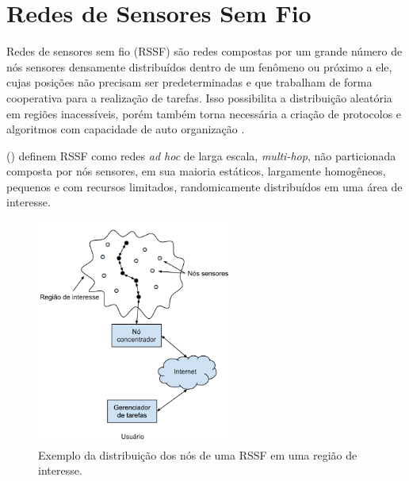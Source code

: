 \section{Redes de Sensores Sem Fio}

Redes de sensores sem fio (RSSF) são redes compostas por um grande número de nós sensores densamente distribuídos dentro de um fenômeno ou próximo a ele, cujas posições não precisam ser predeterminadas e que trabalham de forma cooperativa para a realização de tarefas. Isso possibilita a distribuição aleatória em regiões inacessíveis, porém também torna necessária a criação de protocolos e algoritmos com capacidade de auto organização \cite{Akyildiz2002}.

 (\citeyear{Romer2004}) definem RSSF como redes \textit{ad hoc} de larga escala, \textit{multi-hop}, não particionada composta por nós sensores, em sua maioria estáticos, largamente homogêneos, pequenos e com recursos limitados, randomicamente distribuídos em uma área de interesse.


\begin{figure}[!htb]
\centering
\includegraphics[width=242px,height=280px]{./Pictures/SensorNodesScatteredInASensorField.png}
\caption{Exemplo da distribuição dos nós de uma RSSF em uma região de interesse.} %
\label{fig:snsf} %
\end{figure}

